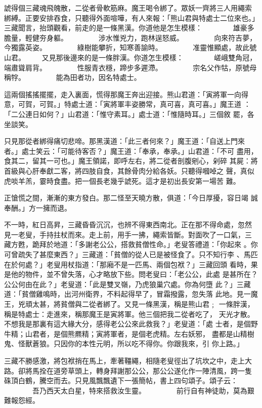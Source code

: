 \begin{pinyinscope}
{諕得個三藏魂飛魄散，二從者骨軟筋麻。魔王喝令綁了。眾妖一齊將三人用繩索
綁縛。正要安排吞食，只聽得外面喧嘩，有人來報：「熊山君與特處士二位來也。」
三藏聞言，抬頭觀看，前走的是一條黑漢。你道他是怎生模樣：
　　　　雄豪多膽量，輕健夯身軀。
　　　　涉水惟兇力，跑林逞怒威。
　　　　向來符吉夢，今獨露英姿。
　　　　綠樹能攀折，知寒善諭時。
　　　　准靈惟顯處，故此號山君。
　　又見那後邊來的是一條胖漢。你道怎生模樣：
　　　　嵯峨雙角冠，端肅聳肩背。
　　　　性服青衣穩，蹄步多遲滯。
　　　　宗名父作牯，原號母稱牸。
　　　　能為田者功，因名特處士。

這兩個搖搖擺擺，走入裏面，慌得那魔王奔出迎接。熊山君道：「寅將軍一向得
意，可賀，可賀。」特處士道：「寅將軍丰姿勝常，真可喜，真可喜。」魔王道
：「二公連日如何？」山君道：「惟守素耳。」處士道：「惟隨時耳。」三個敘
罷，各坐談笑。

只見那從者綁得痛切悲啼。那黑漢道：「此三者何來？」魔王道：「自送上門來
者。」處士笑云：「可能待客否？」魔王道：「奉承，奉承。」山君道：「不可
盡用，食其二，留其一可也。」魔王領諾，即呼左右，將二從者剖腹剜心，剁碎
其屍：將首級與心肝奉獻二客，將四肢自食，其餘骨肉分給各妖。只聽得嘓啅之
聲，真似虎啖羊羔，霎時食盡。把一個長老幾乎諕死。這才是初出長安第一場苦
難。

正愴慌之間，漸漸的東方發白。那二怪至天曉方散，俱道：「今日厚擾，容日竭
誠奉酬。」方一擁而退。

不一時，紅日高昇，三藏昏昏沉沉，也辨不得東西南北。正在那不得命處，忽然
見一老叟，手持拄杖而來。走上前，用手一拂，繩索皆斷。對面吹了一口氣，三
藏方甦，跪拜於地道：「多謝老公公，搭救貧僧性命。」老叟答禮道：「你起來
。你可曾疏失了甚麼東西？」三藏道：「貧僧的從人已是被怪食了。只不知行李
、馬匹在於何處？」老叟用杖指道：「那廂不是一匹馬、兩個包袱？」三藏回頭
看時，果是他的物件，並不曾失落，心才略放下些。問老叟曰：「老公公，此處
是甚所在？公公何由在此？」老叟道：「此是雙叉嶺，乃虎狼巢穴處。你為何墮
此？」三藏道：「貧僧雞鳴時，出河州衛界，不料起得早了，冒霜撥露，忽失落
此地。見一魔王，兇頑太甚，將貧僧與二從者綁了。又見一條黑漢，稱是熊山君﹔
一條胖漢，稱是特處士：走進來，稱那魔王是寅將軍。他三個把我二從者吃了，
天光才散。不想我是那裏有這大緣大分，感得老公公來此救我？」老叟道：「處
士者，是個野牛精；山君者，是個熊羆精；寅將軍者，是個老虎精。左右妖邪，
盡都是山精樹鬼、怪獸蒼狼。只因你的本性元明，所以吃不得你。你跟我來，引
你上路。」

三藏不勝感激，將包袱捎在馬上，牽著韁繩，相隨老叟徑出了坑坎之中，走上大
路。卻將馬拴在道旁草頭上，轉身拜謝那公公，那公公遂化作一陣清風，跨一隻
硃頂白鶴，騰空而去。只見風飄飄遺下一張簡帖，書上四句頌子。頌子云：
　　　　吾乃西天太白星，特來搭救汝生靈。
　　　　前行自有神徒助，莫為艱難報怨經。

}
\end{pinyinscope}
